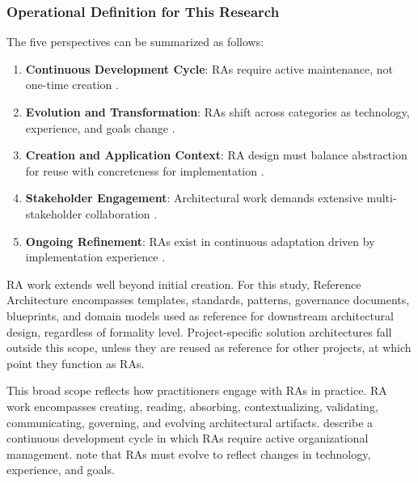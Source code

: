 \subsubsection{Operational Definition for This Research}

The five perspectives can be summarized as follows:

\begin{enumerate}
      \item \textbf{Continuous Development Cycle}: RAs require active
            maintenance, not one-time creation
            \parencite{cloutier_concept_2010}.
      \item \textbf{Evolution and Transformation}: RAs shift across categories
            as technology, experience, and goals change
            \parencite{angelov_framework_2012}.
      \item \textbf{Creation and Application Context}: RA design must balance
            abstraction for reuse with concreteness for implementation
            \parencite{angelov_framework_2012, cloutier_concept_2010}.
      \item \textbf{Stakeholder Engagement}: Architectural work demands
            extensive multi-stakeholder collaboration
            \parencite{ross_j_w_maturity_2004, angelov_framework_2012}.
      \item \textbf{Ongoing Refinement}: RAs exist in continuous adaptation
            driven by implementation experience
            \parencite{cloutier_concept_2010}.
\end{enumerate}

RA work extends well beyond initial creation. For this study, Reference
Architecture encompasses templates, standards, patterns, governance documents,
blueprints, and domain models used as reference for downstream architectural
design, regardless of formality level. Project-specific solution architectures
fall outside this scope, unless they are reused as reference for other projects,
at which point they function as RAs.

This broad scope reflects how practitioners engage with RAs in practice. RA work
encompasses creating, reading, absorbing, contextualizing, validating,
communicating, governing, and evolving architectural artifacts.
\textcite{cloutier_concept_2010} describe a continuous development cycle in
which RAs require active organizational management.
\textcite{angelov_framework_2012} note that RAs must evolve to reflect
changes in technology, experience, and goals.

